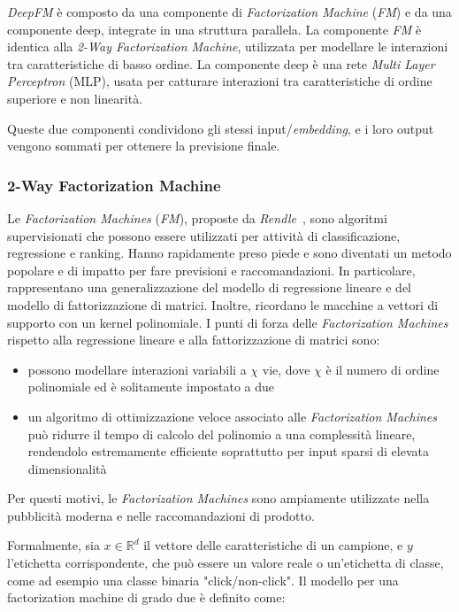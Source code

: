 \textit{DeepFM} è composto da una componente di \textit{Factorization Machine} (\textit{FM}) e da una componente deep, integrate in una struttura parallela. La componente \textit{FM} è identica alla \textit{2-Way Factorization Machine}, utilizzata per modellare le interazioni tra caratteristiche di basso ordine. La componente deep è una rete \textit{Multi Layer Perceptron} (MLP), usata per catturare interazioni tra caratteristiche di ordine superiore e non linearità.

Queste due componenti condividono gli stessi input/\textit{embedding}, e i loro output vengono sommati per ottenere la previsione finale.

\subsubsection{2-Way Factorization Machine}

Le \textit{Factorization Machines} (\textit{FM}), proposte da \textit{Rendle}~\cite{FM}, sono algoritmi supervisionati che possono essere utilizzati per attività di classificazione, regressione e ranking. Hanno rapidamente preso piede e sono diventati un metodo popolare e di impatto per fare previsioni e raccomandazioni. In particolare, rappresentano una generalizzazione del modello di regressione lineare e del modello di fattorizzazione di matrici. Inoltre, ricordano le macchine a vettori di supporto con un kernel polinomiale. I punti di forza delle \textit{Factorization Machines} rispetto alla regressione lineare e alla fattorizzazione di matrici sono: 
\begin{itemize}
    \item possono modellare interazioni variabili a $\chi$ vie, dove $\chi$ è il numero di ordine polinomiale ed è solitamente impostato a due
    \item un algoritmo di ottimizzazione veloce associato alle \textit{Factorization Machines} può ridurre il tempo di calcolo del polinomio a una complessità lineare, rendendolo estremamente efficiente soprattutto per input sparsi di elevata dimensionalità
\end{itemize}

Per questi motivi, le \textit{Factorization Machines} sono ampiamente utilizzate nella pubblicità moderna e nelle raccomandazioni di prodotto.


Formalmente, sia $x \in \mathbb{R}^d$ il vettore delle caratteristiche di un campione, e $y$ l'etichetta corrispondente, che può essere un valore reale o un'etichetta di classe, come ad esempio una classe binaria "click/non-click".  
Il modello per una factorization machine di grado due è definito come:

